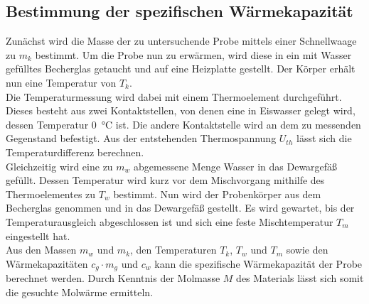 \subsection{Bestimmung der spezifischen Wärmekapazität}
Zunächst wird die Masse der zu untersuchende Probe mittels einer Schnellwaage zu $m_k$ bestimmt.
Um die Probe nun zu erwärmen, wird diese in ein mit Wasser gefülltes Becherglas getaucht und auf eine Heizplatte gestellt.
Der Körper erhält nun eine Temperatur von $T_k$. \\
Die Temperaturmessung wird dabei mit einem Thermoelement durchgeführt.
Dieses besteht aus zwei Kontaktstellen, von denen eine in Eiswasser gelegt wird, dessen Temperatur \SI{0}{\celsius} ist.
Die andere Kontaktstelle wird an dem zu messenden Gegenstand befestigt.
Aus der entstehenden Thermospannung $U_{th}$ lässt sich die Temperaturdifferenz berechnen. \\
Gleichzeitig wird eine zu $m_w$ abgemessene Menge Wasser in das Dewargefäß gefüllt.
Dessen Temperatur wird kurz vor dem Mischvorgang mithilfe des Thermoelementes zu $T_w$ bestimmt.
Nun wird der Probenkörper aus dem Becherglas genommen und in das Dewargefäß gestellt.
Es wird gewartet, bis der Temperaturausgleich abgeschlossen ist und sich eine feste Mischtemperatur $T_m$ eingestellt hat. \\
Aus den Massen $m_w$ und $m_k$, den Temperaturen $T_k$, $T_w$ und $T_m$ sowie den Wärmekapazitäten $c_g \cdot m_g$ und $c_w$ kann die spezifische Wärmekapazität der Probe berechnet werden.
Durch Kenntnis der Molmasse $M$ des Materials lässt sich somit die gesuchte Molwärme ermitteln.  \\
